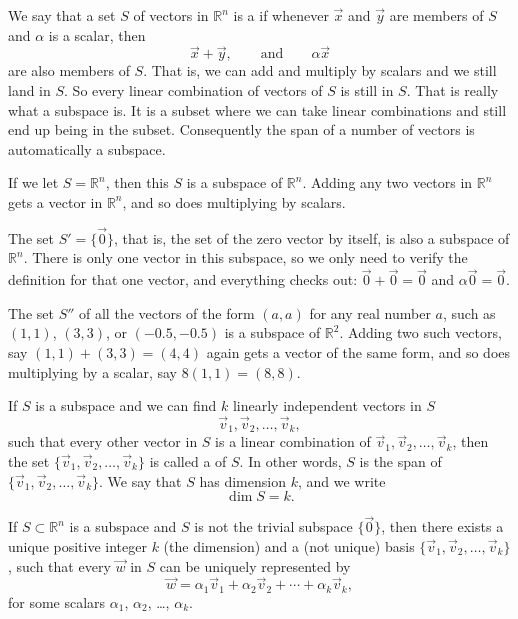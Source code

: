 We say that a set $S$ of vectors in ${\mathbb R}^n$ is a
\emph{} if
whenever $\vec{x}$ and $\vec{y}$ are members of $S$ and
$\alpha$ is a scalar, then
\begin{equation*}
\vec{x} + \vec{y}, \qquad \text{and} \qquad \alpha \vec{x}
\end{equation*}
are also members of $S$.  That is, we can add and multiply by scalars
and we still land in $S$.  So every linear combination of vectors of
$S$ is still in $S$.  That is really what a subspace is.  It is a subset
where we can take linear combinations and still end up being in the subset.
Consequently the span of a number of vectors is automatically a subspace.

\begin{example} \label{example:simplesubspaces}
If we let $S = {\mathbb R}^n$, then this $S$ is a subspace of
${\mathbb R}^n$.  Adding any two vectors in ${\mathbb R}^n$ gets a vector in
${\mathbb R}^n$, and so does multiplying by scalars.

The set $S' = \{ \vec{0} \}$, that is,
the set of the zero vector by itself, is 
also a subspace of ${\mathbb R}^n$.  There is only one vector in this
subspace, so we only need to verify the definition for that one vector, and everything checks
out: $\vec{0}+\vec{0} = \vec{0}$ and $\alpha \vec{0} = \vec{0}$.

The set $S''$ of all the vectors of the form
$(a,a)$ for any real number $a$, such as $(1,1)$, $(3,3)$, or $(-0.5,-0.5)$
is a subspace of ${\mathbb R}^2$.  Adding two such vectors, say
$(1,1)+(3,3) = (4,4)$ again gets a vector of the same form, and so does
multiplying by a scalar, say $8(1,1) = (8,8)$.
\end{example}

If $S$ is a subspace and we can find $k$ linearly independent vectors in $S$
\begin{equation*}
\vec{v}_1, \vec{v}_2, \ldots, \vec{v}_k ,
\end{equation*}
such that every other vector in $S$ is a linear combination of $\vec{v}_1,
\vec{v}_2,\ldots, \vec{v}_k$,
then the set 
$\{ \vec{v}_1, \vec{v}_2, \ldots, \vec{v}_k \}$ is called a
\emph{} of $S$.  In other words, $S$
is the span of 
$\{ \vec{v}_1, \vec{v}_2, \ldots, \vec{v}_k \}$.
We say that $S$ has dimension $k$,
and we write 
\begin{equation*}
\dim S = k .
\end{equation*}

\begin{theorem}
If $S \subset {\mathbb R}^n$ is a subspace and $S$ is not the trivial
subspace $\{ \vec{0} \}$, then there exists a
unique positive integer $k$ (the dimension) and a (not unique)
basis
$\{ \vec{v}_1, \vec{v}_2, \ldots, \vec{v}_k \}$, such that every
$\vec{w}$ in $S$ can be uniquely represented by
\begin{equation*}
\vec{w} = 
\alpha_1 \vec{v}_1 + 
\alpha_2 \vec{v}_2 + 
\cdots
+
\alpha_k \vec{v}_k ,
\end{equation*}
for some scalars $\alpha_1$, $\alpha_2$, \ldots, $\alpha_k$.
\end{theorem}

